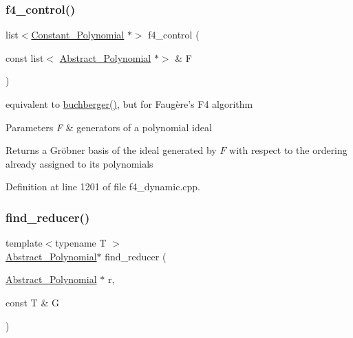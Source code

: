 \mbox{\label{group___g_b_computation_ga24647e1e20f18283bc931e723ba9fc22}} 
\subsubsection{\texorpdfstring{f4\+\_\+control()}{f4\_control()}}
{\footnotesize\ttfamily list$<$\hyperlink{group__polygroup_class_constant___polynomial}{Constant\+\_\+\+Polynomial} $\ast$$>$ f4\+\_\+control (\begin{DoxyParamCaption}\item[{const list$<$ \hyperlink{group__polygroup_class_abstract___polynomial}{Abstract\+\_\+\+Polynomial} $\ast$$>$ \&}]{F }\end{DoxyParamCaption})}



equivalent to {\ttfamily \hyperlink{group___g_b_computation_ga37aa7e2fec96fac6c914934a4243f603}{buchberger()}}, but for Faug\`{e}re's F4 algorithm 


\begin{DoxyParams}{Parameters}
{\em F} & generators of a polynomial ideal \\
\hline
\end{DoxyParams}
\begin{DoxyReturn}{Returns}
a Gr\"{o}bner basis of the ideal generated by $ F $ with respect to the ordering already assigned to its polynomials 
\end{DoxyReturn}


Definition at line 1201 of file f4\+\_\+dynamic.\+cpp.

\mbox{\label{group___g_b_computation_ga5a0f37dcb4ac73e553793fd627941c48}} 
\subsubsection{\texorpdfstring{find\+\_\+reducer()}{find\_reducer()}}
{\footnotesize\ttfamily template$<$typename T $>$ \\
\hyperlink{group__polygroup_class_abstract___polynomial}{Abstract\+\_\+\+Polynomial}$\ast$ find\+\_\+reducer (\begin{DoxyParamCaption}\item[{\hyperlink{group__polygroup_class_abstract___polynomial}{Abstract\+\_\+\+Polynomial} $\ast$}]{r,  }\item[{const T \&}]{G }\end{DoxyParamCaption})}



